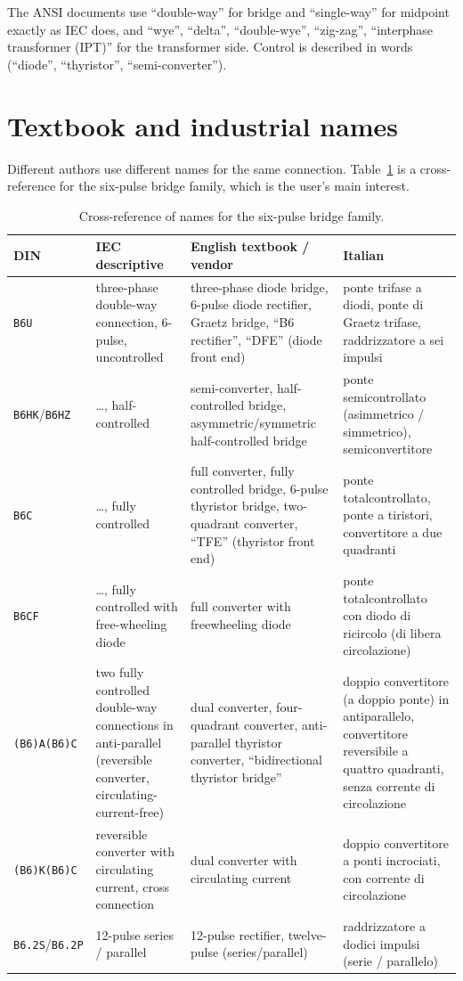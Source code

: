 \documentclass[11pt,a4paper]{article}
\newcommand{\code}[1]{\texttt{#1}}
\begin{document}
The ANSI documents use ``double-way'' for bridge and ``single-way'' for midpoint exactly as IEC does, and ``wye'', ``delta'', ``double-wye'', ``zig-zag'', ``interphase transformer (IPT)'' for the transformer side. Control is described in words (``diode'', ``thyristor'', ``semi-converter'').

\section{Textbook and industrial names}

Different authors use different names for the same connection. Table~\ref{tab:cross} is a cross-reference for the six-pulse bridge family, which is the user's main interest.

\begin{table}[htb]
\centering
\caption{Cross-reference of names for the six-pulse bridge family.}
\label{tab:cross}
\small
\begin{tabular}{p{2cm}p{3.5cm}p{4.4cm}p{4.4cm}}
\toprule
DIN & IEC descriptive & English textbook / vendor & Italian \\
\midrule
\code{B6U} & three-phase double-way connection, 6-pulse, uncontrolled & three-phase diode bridge, 6-pulse diode rectifier, Graetz bridge, ``B6 rectifier'', ``DFE'' (diode front end) & ponte trifase a diodi, ponte di Graetz trifase, raddrizzatore a sei impulsi \\
\code{B6HK}/\code{B6HZ} & \ldots, half-controlled & semi-converter, half-controlled bridge, asymmetric/symmetric half-controlled bridge & ponte semicontrollato (asimmetrico / simmetrico), semiconvertitore \\
\code{B6C} & \ldots, fully controlled & full converter, fully controlled bridge, 6-pulse thyristor bridge, two-quadrant converter, ``TFE'' (thyristor front end) & ponte totalcontrollato, ponte a tiristori, convertitore a due quadranti \\
\code{B6CF} & \ldots, fully controlled with free-wheeling diode & full converter with freewheeling diode & ponte totalcontrollato con diodo di ricircolo (di libera circolazione) \\
\code{(B6)A(B6)C} & two fully controlled double-way connections in anti-parallel (reversible converter, circulating-current-free) & dual converter, four-quadrant converter, anti-parallel thyristor converter, ``bidirectional thyristor bridge'' & doppio convertitore (a doppio ponte) in antiparallelo, convertitore reversibile a quattro quadranti, senza corrente di circolazione \\
\code{(B6)K(B6)C} & reversible converter with circulating current, cross connection & dual converter with circulating current & doppio convertitore a ponti incrociati, con corrente di circolazione \\
\code{B6.2S}/\code{B6.2P} & 12-pulse series / parallel & 12-pulse rectifier, twelve-pulse (series/parallel) & raddrizzatore a dodici impulsi (serie / parallelo) \\
\bottomrule
\end{tabular}
\end{table}
\end{document}
